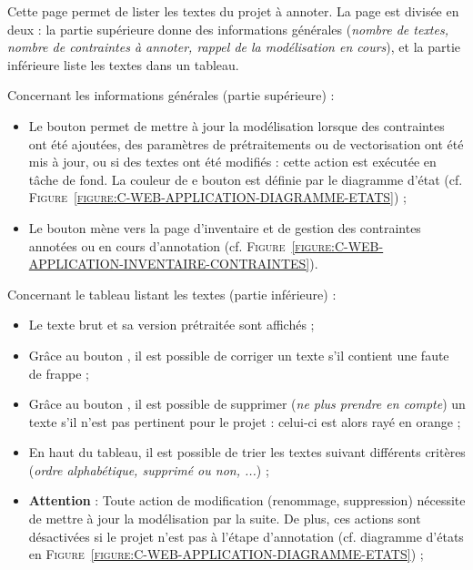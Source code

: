 			Cette page permet de lister les textes du projet à annoter.
			La page est divisée en deux : la partie supérieure donne des informations générales (\textit{nombre de textes, nombre de contraintes à annoter, rappel de la modélisation en cours}), et la partie inférieure liste les textes dans un tableau.
			
			Concernant les informations générales (partie supérieure) :
			\begin{itemize}
				\item Le bouton  permet de mettre à jour la modélisation lorsque des contraintes ont été ajoutées, des paramètres de prétraitements ou de vectorisation ont été mis à jour, ou si des textes ont été modifiés : cette action est exécutée en tâche de fond.
				La couleur de e bouton est définie par le diagramme d'état (cf. \textsc{Figure~\ref{figure:C-WEB-APPLICATION-DIAGRAMME-ETATS}}) ;
				\item Le bouton  mène vers la page d'inventaire et de gestion des contraintes annotées ou en cours d'annotation (cf. \textsc{Figure~\ref{figure:C-WEB-APPLICATION-INVENTAIRE-CONTRAINTES}}).
			\end{itemize}
			
			Concernant le tableau listant les textes (partie inférieure) :
			\begin{itemize}
				\item Le texte brut et sa version prétraitée sont affichés ;
				\item Grâce au bouton \textguillemets{\faPen}, il est possible de corriger un texte s'il contient une faute de frappe ;
				\item Grâce au bouton \textguillemets{\textcolor{colorApplicationDELETE}{\faTrash}}, il est possible de supprimer (\textit{ne plus prendre en compte}) un texte s'il n'est pas pertinent pour le projet : celui-ci est alors rayé en \textcolor{colorApplicationDELETE}{orange} ;
				\item En haut du tableau, il est possible de trier les textes suivant différents critères (\textit{ordre alphabétique, supprimé ou non, ...}) ;
				\item \textbf{Attention} : Toute action de modification (renommage, suppression) nécessite de mettre à jour la modélisation par la suite.
				De plus, ces actions sont désactivées si le projet n'est pas à l'étape d'annotation (cf. diagramme d'états en \textsc{Figure~\ref{figure:C-WEB-APPLICATION-DIAGRAMME-ETATS}}) ;
			\end{itemize}
		
